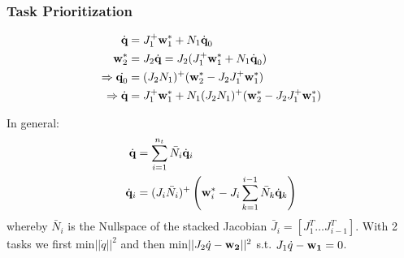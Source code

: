 \documentclass[a4paper, 8pt]{extarticle}
\begin{document}
\begin{multicols*}{3}
\subsubsection*{Task Prioritization}
\begin{align*}
\dot{\textbf{q}} &= J_1^+\textbf w_1^* + N_1\dot{\textbf{q}}_0\\
\textbf{w}_2^* &= J_2\dot{\mathbf q} = J_2(J_1^+\textbf w_1^* + N_1\dot{\textbf{q}}_0)\\
\Rightarrow \dot{\textbf q_0} &= (J_2N_1)^+(\textbf w_2^* - J_2J_1^+\textbf w_1^*)\\
\Rightarrow \dot{\textbf{q}} &= J_1^+\textbf w_1^* + N_1(J_2N_1)^+(\textbf w_2^* - J_2J_1^+\textbf w_1^*)
\end{align*}

In general:
\begin{align*}
\dot{\mathbf q} &= \sum_{i=1}^{n_t}\bar N_i \dot{\mathbf q}_i \\ 
\dot{\mathbf q}_i &= (J_i \bar N_i)^+ \left( \textbf w_i^* - J_i \sum_{k=1}^{i-1}\bar N_k \dot{\mathbf q}_k \right)
\end{align*}
whereby $\bar N_i$ is the Nullspace of the stacked Jacobian $\bar J_{i}=[J_{1}^{T} \ldots J_{i-1}^{T}]$. With 2 tasks we first min$||\dot{q}||^2$ and then min$||J_{2}\dot{q}-{\bf w_{2}}||^2$ s.t. $J_{1}\dot{q}-{\bf w_{1}}=0$.



\end{multicols*}
\end{document}
